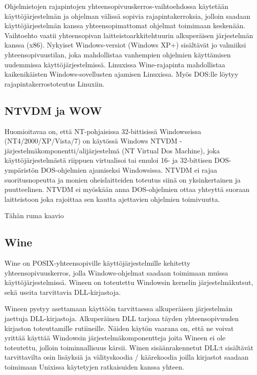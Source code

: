 \documentclass[11pt,a4paper,oneside,article]{memoir}
\begin{document}


Ohjelmistojen rajapintojen yhteensopivuuskerros-vaihtoehdossa  käytetään käyttöjärjestelmän ja ohjelman välissä sopivia rajapintakerroksia, jolloin saadaan käyttöjärjestelmän kanssa yhteensopimattomat ohjelmat toimimaan keskenään. Vaihtoehto vaatii yhteensopivan laitteistoarkkitehtuurin alkuperäisen järjestelmän kanssa (x86). Nykyiset Windows-versiot (Windows XP+) sisältävät jo valmiiksi yhteensopivuustilan, joka mahdollistaa vanhempien ohjelmien käyttämisen uudemmissa käyttöjärjestelmissä. Linuxissa Wine-rajapinta mahdollistaa kaikenikäisten Windows-sovellusten ajamisen Linuxissa. Myös DOS:lle löytyy rajapintakerrostoteutus Linuxiin.

\subsection{NTVDM ja WOW}

\lipsum[1-5]

Huomioitavaa on, että NT-pohjaisissa 32-bittisissä Windowseissa (NT4/2000/XP/Vista/7) on käytössä Windows NTVDM -järjestelmäkomponentti/alijärjestelmä (NT Virtual Dos Machine), joka käyttöjärjestelmästä riippuen virtualisoi tai emuloi 16- ja 32-bittisen DOS-ympäristön DOS-ohjelmien ajamiseksi Windowsissa. NTVDM ei rajaa suoritusnopeutta ja monien oheislaitteiden toteutus siinä on yksinkertainen ja puutteelinen. NTVDM ei myöskään anna DOS-ohjelmien ottaa yhteyttä suoraan laitteistoon joka rajoittaa sen kautta ajettavien ohjelmien toimivuutta.

Tähän ruma kaavio

\subsection{Wine}
Wine on POSIX-yhteensopiville käyttöjärjestelmille kehitetty yhteensopivuuskerros, jolla Windows-ohjelmat saadaan toimimaan muissa käyttöjärjestelmissä. Wineen on toteutettu Windowsin kernelin järjestelmäkutsut, sekä useita tarvittavia DLL-kirjastoja. 

Wineen pystyy asettamaan käyttöön tarvittaessa alkuperäisen järjestelmän jaettuja DLL-kirjastoja. Alkuperäinen DLL tarjoaa täyden yhteensopivuuden kirjaston toteuttamille rutiineille. Näiden käytön vaarana on, että ne voivat yrittää käyttää Windowsin järjestelmäkomponentteja joita Wineen ei ole toteutettu, jolloin toiminnallisuus kärsii. Winen sisäänrakennetut DLL:t sisältävät tarvittavilta osin lisäyksiä ja välityskoodia / käärekoodia joilla kirjastot saadaan toimimaan Unixissa käytetyjen ratkaisuiden kanssa yhteen. 
\end{document}

